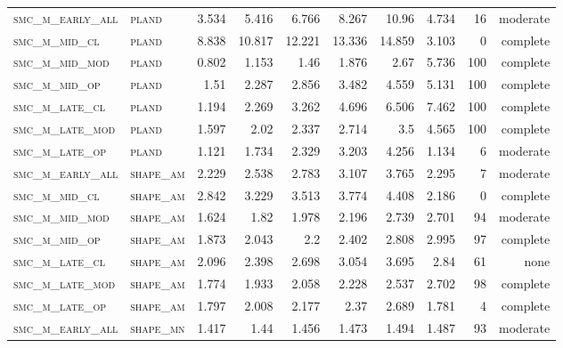 \begin{landscape}
\begin{center}
\begin{footnotesize}
\begin{longtable}{llrrrrr|rrr}
\textsc{smc\_m\_early\_all} & \textsc{pland     }   & 3.534    & 5.416    & 6.766    & 8.267    & 10.96    & 4.734    & 16  & moderate \\
\textsc{smc\_m\_mid\_cl   } & \textsc{pland     }   & 8.838    & 10.817   & 12.221   & 13.336   & 14.859   & 3.103    & 0   & complete \\
\textsc{smc\_m\_mid\_mod  } & \textsc{pland     }   & 0.802    & 1.153    & 1.46     & 1.876    & 2.67     & 5.736    & 100 & complete \\
\textsc{smc\_m\_mid\_op   } & \textsc{pland     }   & 1.51     & 2.287    & 2.856    & 3.482    & 4.559    & 5.131    & 100 & complete \\
\textsc{smc\_m\_late\_cl  } & \textsc{pland     }   & 1.194    & 2.269    & 3.262    & 4.696    & 6.506    & 7.462    & 100 & complete \\
\textsc{smc\_m\_late\_mod } & \textsc{pland     }   & 1.597    & 2.02     & 2.337    & 2.714    & 3.5      & 4.565    & 100 & complete \\
\textsc{smc\_m\_late\_op  } & \textsc{pland     }   & 1.121    & 1.734    & 2.329    & 3.203    & 4.256    & 1.134    & 6   & moderate \\
\textsc{smc\_m\_early\_all} & \textsc{shape\_am }   & 2.229    & 2.538    & 2.783    & 3.107    & 3.765    & 2.295    & 7   & moderate \\
\textsc{smc\_m\_mid\_cl   } & \textsc{shape\_am }   & 2.842    & 3.229    & 3.513    & 3.774    & 4.408    & 2.186    & 0   & complete \\
\textsc{smc\_m\_mid\_mod  } & \textsc{shape\_am }   & 1.624    & 1.82     & 1.978    & 2.196    & 2.739    & 2.701    & 94  & moderate \\
\textsc{smc\_m\_mid\_op   } & \textsc{shape\_am }   & 1.873    & 2.043    & 2.2      & 2.402    & 2.808    & 2.995    & 97  & complete \\
\textsc{smc\_m\_late\_cl  } & \textsc{shape\_am }   & 2.096    & 2.398    & 2.698    & 3.054    & 3.695    & 2.84     & 61  & none     \\
\textsc{smc\_m\_late\_mod } & \textsc{shape\_am }   & 1.774    & 1.933    & 2.058    & 2.228    & 2.537    & 2.702    & 98  & complete \\
\textsc{smc\_m\_late\_op  } & \textsc{shape\_am }   & 1.797    & 2.008    & 2.177    & 2.37     & 2.689    & 1.781    & 4   & complete \\
\textsc{smc\_m\_early\_all} & \textsc{shape\_mn }   & 1.417    & 1.44     & 1.456    & 1.473    & 1.494    & 1.487    & 93  & moderate \\

\end{longtable}
\end{footnotesize}
\end{center}
\end{landscape}
